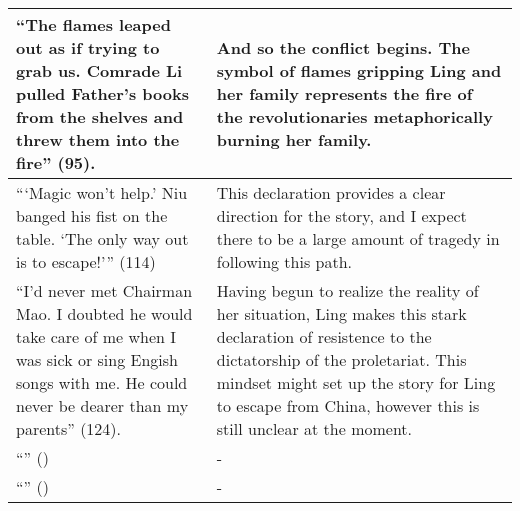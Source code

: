 \documentclass[12pt]{article}
\begin{document}
\begin{tabularx}{\textwidth}{ |X|X| }
  \hline
  ``The flames leaped out as if trying to grab us. Comrade Li pulled Father's books from the shelves and threw them into the fire'' (95). & And so the conflict begins. The symbol of flames gripping Ling and her family represents the fire of the revolutionaries metaphorically burning her family. \\
  \hline
  ```Magic won't help.' Niu banged his fist on the table. `The only way out is to escape!''' (114) & This declaration provides a clear direction for the story, and I expect there to be a large amount of tragedy in following this path. \\
  \hline
  ``I'd never met Chairman Mao. I doubted he would take care of me when I was sick or sing Engish songs with me. He could never be dearer than my parents'' (124). & Having begun to realize the reality of her situation, Ling makes this stark declaration of resistence to the dictatorship of the proletariat. This mindset might set up the story for Ling to escape from China, however this is still unclear at the moment. \\
  \hline
  ``'' () & - \\
  \hline
  ``'' () & - \\
  \hline


\end{tabularx}
\vspace{2em}
\end{document}
